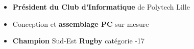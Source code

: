 %
%
%

\twocolumnsection
{
\begin{skills}
\end{skills}}
{
\vspace{1em}
\begin{itemize}
	\item \textbf{Président du Club d'Informatique} de Polytech Lille
	\item Conception et \textbf{assemblage PC} sur mesure
    \item \textbf{Champion} Sud-Est \textbf{Rugby} catégorie -17
\end{itemize}
}
